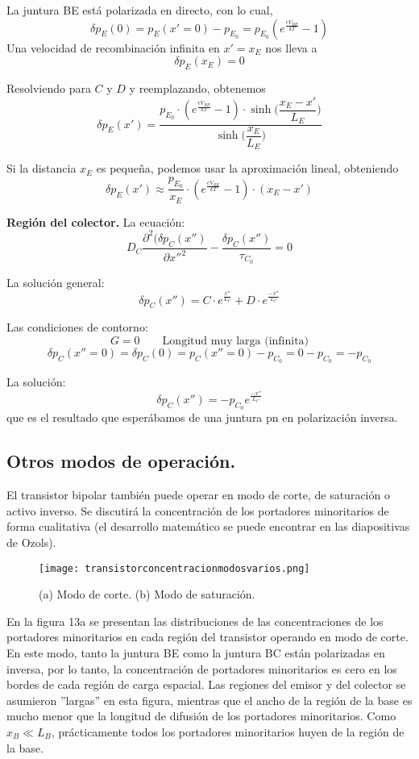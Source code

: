\documentclass[12pt,a4paper]{article}
\begin{document}
La juntura BE está polarizada en directo, con lo cual,
\[ \delta p_{E}(0)=p_{E}(x'=0)-p_{E_{0}}=p_{E_{0}} ( e^{\frac{eV_{BE}}{kT}} -1 ) \]
Una velocidad de recombinación infinita en $x'=x_{E}$ nos lleva a
\[ \delta p_{E}(x_{E})=0 \]

Resolviendo para $C$ y $D$ y reemplazando, obtenemos
\[ \delta p_{E}(x')=\frac{ p_{E_{0}} \cdot ( e^{\frac{eV_{BE}}{kT}} -1 ) \cdot \sinh \bigg( \dfrac{x_{E}-x'}{L_{E}} \bigg) }{ \sinh \bigg( \dfrac{x_{E}}{L_{E}} \bigg) } \]

Si la distancia $x_{E}$ es pequeña, podemos usar la aproximación lineal, obteniendo
\[ \delta p_{E}(x') \approx \frac{p_{E_{0}}}{x_{E}} \cdot ( e^{\frac{eV_{BE}}{kT}} -1 ) \cdot (x_{E} - x') \]

\textbf{Región del colector.} La ecuación:
\[ D_{C} \frac{\partial^{2} (\delta p_{C}(x'')}{\partial x''^{2}} - \frac{\delta p_{C}(x'')}{\tau _{C_{0}}}=0 \]

La solución general:
\[ \delta p_{C}(x'')=C \cdot e^{\frac{x''}{L_{C}}}+D \cdot e^{\frac{-x''}{L_{C}}} \]

Las condiciones de contorno:
\[ G=0 \qquad \textrm{Longitud muy larga (infinita)} \]
\[ \delta p_{C}(x''=0)=\delta p_{C}(0)=p_{C}(x''=0)-p_{C_{0}}=0-p_{C_{0}}=-p_{C_{0}} \]

La solución:
\[ \delta p_{C}(x'')=-p_{C_{0}} e^{\frac{-x''}{L_{C}}} \]
que es el resultado que esperábamos de una juntura pn en polarización inversa.

\subsection{Otros modos de operación.}

El transistor bipolar también puede operar en modo de corte, de saturación o activo inverso. Se discutirá la concentración de los portadores minoritarios de forma cualitativa (el desarrollo matemático se puede encontrar en las diapositivas de Ozols).

\begin{figure}[ht!]
\begin{center}
\texttt{[image: transistorconcentracionmodosvarios.png]}
\caption{(a) Modo de corte. (b) Modo de saturación.}
\end{center}
\end{figure}

En la figura 13a se presentan las distribuciones de las concentraciones de los portadores minoritarios en cada región del transistor operando en modo de corte. En este modo, tanto la juntura BE como la juntura BC están polarizadas en inversa, por lo tanto, la concentración de portadores minoritarios es cero en los bordes de cada región de carga espacial. Las regiones del emisor y del colector se asumieron ''largas'' en esta figura, mientras que el ancho de la región de la base es mucho menor que la longitud de difusión de los portadores minoritarios. Como $x_{B} \ll L_{B}$, prácticamente todos los portadores minoritarios huyen de la región de la base.
\end{document}
